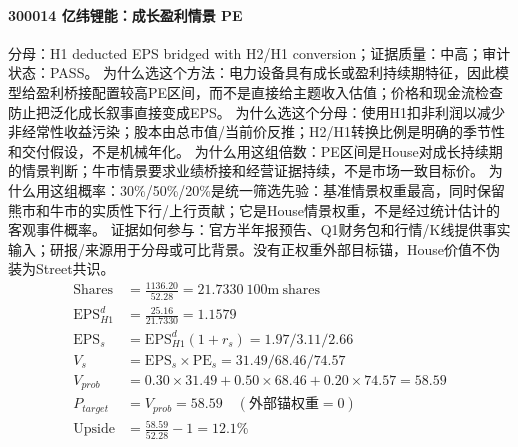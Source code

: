 \paragraph{300014 亿纬锂能：成长盈利情景 PE}
分母：H1 deducted EPS bridged with H2/H1 conversion；证据质量：中高；审计状态：PASS。
为什么选这个方法：电力设备具有成长或盈利持续期特征，因此模型给盈利桥接配置较高PE区间，而不是直接给主题收入估值；价格和现金流检查防止把泛化成长叙事直接变成EPS。
为什么选这个分母：使用H1扣非利润以减少非经常性收益污染；股本由总市值/当前价反推；H2/H1转换比例是明确的季节性和交付假设，不是机械年化。
为什么用这组倍数：PE区间是House对成长持续期的情景判断；牛市情景要求业绩桥接和经营证据持续，不是市场一致目标价。
为什么用这组概率：30\%/50\%/20\%是统一筛选先验：基准情景权重最高，同时保留熊市和牛市的实质性下行/上行贡献；它是House情景权重，不是经过统计估计的客观事件概率。
证据如何参与：官方半年报预告、Q1财务包和行情/K线提供事实输入；研报/来源用于分母或可比背景。没有正权重外部目标锚，House价值不伪装为Street共识。
\begin{align*}
\mathrm{Shares} &= \frac{1136.20}{52.28}=21.7330\ \mathrm{100m\ shares}\\
\mathrm{EPS}_{H1}^d &= \frac{25.16}{21.7330}=1.1579\\
\mathrm{EPS}_s &= \mathrm{EPS}_{H1}^d(1+r_s)=1.97/3.11/2.66\\
V_s &= \mathrm{EPS}_s\times \mathrm{PE}_s=31.49/68.46/74.57\\
V_{prob} &= 0.30\times 31.49+0.50\times 68.46+0.20\times 74.57=58.59\\
P_{target} &= V_{prob}=58.59\quad(\text{外部锚权重}=0)\\
\mathrm{Upside} &= \frac{58.59}{52.28}-1=12.1\%\\
\end{align*}

